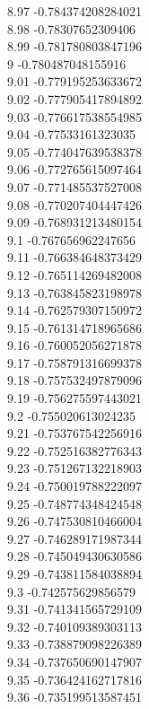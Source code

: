 {8.97	-0.784374208284021\\
8.98	-0.78307652309406\\
8.99	-0.781780803847196\\
9	-0.780487048155916\\
9.01	-0.779195253633672\\
9.02	-0.777905417894892\\
9.03	-0.776617538554985\\
9.04	-0.77533161323035\\
9.05	-0.774047639538378\\
9.06	-0.772765615097464\\
9.07	-0.771485537527008\\
9.08	-0.770207404447426\\
9.09	-0.768931213480154\\
9.1	-0.767656962247656\\
9.11	-0.766384648373429\\
9.12	-0.765114269482008\\
9.13	-0.763845823198978\\
9.14	-0.762579307150972\\
9.15	-0.761314718965686\\
9.16	-0.760052056271878\\
9.17	-0.758791316699378\\
9.18	-0.757532497879096\\
9.19	-0.756275597443021\\
9.2	-0.755020613024235\\
9.21	-0.753767542256916\\
9.22	-0.752516382776343\\
9.23	-0.751267132218903\\
9.24	-0.750019788222097\\
9.25	-0.748774348424548\\
9.26	-0.747530810466004\\
9.27	-0.746289171987344\\
9.28	-0.745049430630586\\
9.29	-0.743811584038894\\
9.3	-0.742575629856579\\
9.31	-0.741341565729109\\
9.32	-0.740109389303113\\
9.33	-0.738879098226389\\
9.34	-0.737650690147907\\
9.35	-0.736424162717816\\
9.36	-0.735199513587451\\
}

